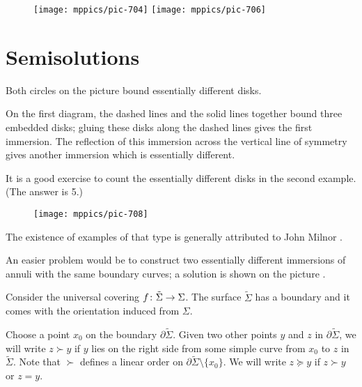 {

\begin{wrapfigure}{r}{29 mm}
\vskip-4mm
\centering
\texttt{[image: mppics/pic-704]}
\bigskip
\texttt{[image: mppics/pic-706]}
\end{wrapfigure}

\section*{Semisolutions}

Both circles on the picture bound essentially different disks.



\medskip

On the first diagram, the dashed lines and the solid lines together bound three embedded disks;
gluing these disks along the dashed lines gives the first immersion.
The reflection of this immersion across the vertical line of symmetry gives another immersion which is essentially different.
\qeds

}


It is a good exercise to count the essentially different disks in the second example. 
(The answer is 5.) 

{

\begin{wrapfigure}{r}{30 mm}
\vskip-7mm
\centering
\texttt{[image: mppics/pic-708]}
\end{wrapfigure}

The existence of examples of that type is generally attributed to John Milnor \cite{bennequin}.

An easier problem would be to construct two essentially different immersions of annuli with the same boundary curves; a solution is shown on the picture \cite[for more details and references see][]{eppstein-mumford}.

}

Consider the universal covering 
$f\:\tilde\Sigma\z\to\Sigma$.
The surface $\tilde \Sigma$ has a boundary and it comes with the orientation induced from $\Sigma$.



Choose a point $x_0$ on the boundary $\partial \tilde \Sigma$.
Given two other points $y$ and $z$ in $\partial \tilde \Sigma$, we will write
$z\succ y$ if $y$ lies on the right side from some simple curve from $x_0$ to $z$ in $\tilde\Sigma$.
Note that  $\succ $ defines a linear order on $\partial\tilde\Sigma\setminus\{x_0\}$.
We will write $z \succeq y$ 
if $z\succ y$ or $z=y$.

